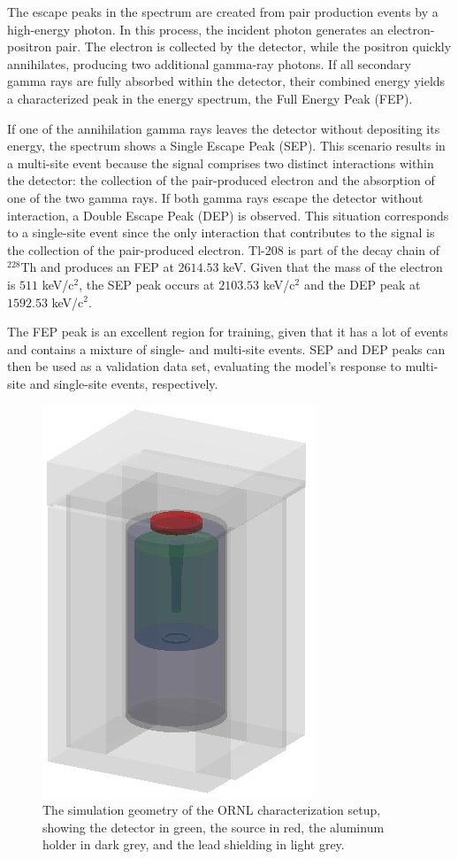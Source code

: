 The escape peaks in the spectrum are created from pair production events by a high-energy photon. In this process, the incident photon generates an electron-positron pair. The electron is collected by the detector, while the positron quickly annihilates, producing two additional gamma-ray photons. If all secondary gamma rays are fully absorbed within the detector, their combined energy yields a characterized peak in the energy spectrum, the Full Energy Peak (FEP).

If one of the annihilation gamma rays leaves the detector without depositing its energy, the spectrum shows a Single Escape Peak (SEP). This scenario results in a multi-site event because the signal comprises two distinct interactions within the detector: the collection of the pair-produced electron and the absorption of one of the two gamma rays. If both gamma rays escape the detector without interaction, a Double Escape Peak (DEP) is observed. This situation corresponds to a single-site event since the only interaction that contributes to the signal is the collection of the pair-produced electron. Tl-208 is part of the decay chain of $^{228}$Th and produces an FEP at $2614.53$ keV. Given that the mass of the electron is $511$ keV/c$^2$, the SEP peak occurs at $2103.53$ keV/c$^2$ and the DEP peak at $1592.53$ keV/c$^2$. 

The FEP peak is an excellent region for training, given that it has a lot of events and contains a mixture of single- and multi-site events. SEP and DEP peaks can then be used as a validation data set, evaluating the model's response to multi-site and single-site events, respectively.

\begin{figure}%
    \centering
    \includegraphics[width=0.4\linewidth]{ch7/figs/shielding.jpeg}
    \caption{The simulation geometry of the ORNL characterization setup, showing the detector in green, the source in red, the aluminum holder in dark grey, and the lead shielding in light grey.}
   \label{ch7_fig_g4simple_setup}
\end{figure}


